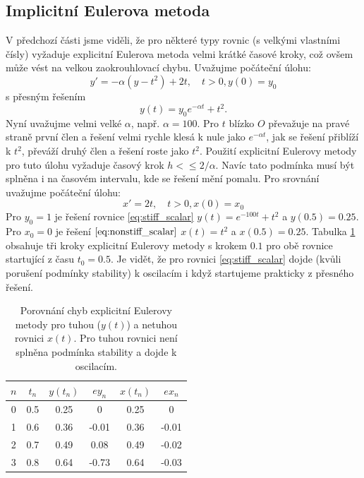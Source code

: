 \documentclass[a4paper, 12pt]{book}
\theoremstyle{definition}
\begin{document}
\subsection{Implicitní Eulerova metoda}
V předchozí části jsme viděli, že pro některé typy rovnic (s velkými vlastními čísly) vyžaduje explicitní Eulerova metoda 
velmi krátké časové kroky, což ovšem může vést na velkou zaokrouhlovací chybu. Uvažujme počáteční úlohu:
\begin{equation}
  \label{eq:stiff_scalar}
  y' = -\alpha (y-t^2) +2t,\quad t>0, y(0)=y_0
\end{equation}
s přesným řešením
\[
    y(t)=y_0e^{-\alpha t} + t^2.
\]
Nyní uvažujme velmi velké $\alpha$, např. $\alpha=100$. Pro $t$ blízko $O$ převažuje na pravé straně první člen a řešení 
velmi rychle klesá k nule jako $e^{-\alpha t}$, jak se řešení přiblíží k $t^2$, převáží druhý člen a řešení roste jako $t^2$.
Použití explicitní Eulerovy metody pro tuto úlohu vyžaduje časový krok $h<\le 2/\alpha$. Navíc tato podmínka musí být splněna
i na časovém intervalu, kde se řešení mění pomalu. Pro srovnání uvažujme počáteční úlohu:
\begin{equation}
    \label{eq:nonstiff_scalar}
    x' = 2t, \quad t>0, x(0)=x_0
\end{equation}
Pro $y_0=1$ je řešení rovnice \eqref{eq:stiff_scalar} $y(t) = e^{-100t} +t^2$ a $y(0.5) = 0.25$. Pro $x_0=0$ je řešení $\eqref{eq:nonstiff_scalar}$
$x(t)=t^2$ a $x(0.5)=0.25$. Tabulka \ref{tab:stiff_osc} obsahuje tři kroky explicitní Eulerovy metody s krokem $0.1$ pro obě rovnice startující z času $t_0=0.5$.
Je vidět, že pro rovnici \eqref{eq:stiff_scalar} dojde (kvůli porušení podmínky stability) k oscilacím i když startujeme prakticky z přesného řešení.

\begin{table}[h]
\centering
\begin{tabular}{|c|c|c|c|c|c|}
\hline
$n$ & $t_n$ & $y(t_n)$ & $ey_n$ & $x(t_n)$ & $ex_n$\\ 
\hline
0 & 0.5 & 0.25 & 0 & 0.25 & 0\\ 
\hline
1 & 0.6 & 0.36 & -0.01 & 0.36 & -0.01\\ 
\hline
2 & 0.7 & 0.49 & 0.08 & 0.49  & -0.02 \\
\hline
3 & 0.8 & 0.64 & -0.73  & 0.64  & -0.03\\
\hline\end{tabular}
\caption{Porovnání chyb explicitní Eulerovy metody pro tuhou ($y(t)$) a netuhou rovnici $x(t)$. 
Pro tuhou rovnici není splněna podmínka stability a dojde k oscilacím.} 
\label{tab:stiff_osc}
\end{table}
\end{document}
